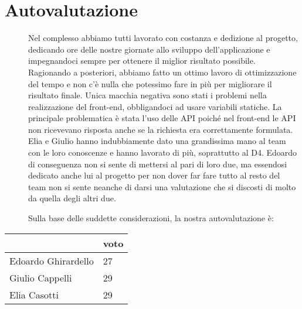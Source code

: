 \documentclass{article}
\begin{document}
\section{Autovalutazione}
\begin{description}
    \item[] Nel complesso abbiamo tutti lavorato con costanza e dedizione al progetto, dedicando ore delle nostre giornate allo sviluppo dell'applicazione e impegnandoci sempre per ottenere il miglior risultato possibile.
        Ragionando a posteriori, abbiamo fatto un ottimo lavoro di ottimizzazione del tempo e non c'è nulla che potessimo fare in più per migliorare il risultato finale.
        Unica macchia negativa sono stati i problemi nella realizzazione del front-end, obbligandoci ad usare variabili statiche.
        La principale problematica è stata l'uso delle API poiché nel front-end le API non ricevevano risposta anche se la richiesta era correttamente formulata.
        Elia e Giulio hanno indubbiamente dato una grandissima mano al team con le loro conoscenze e hanno lavorato di più, soprattutto al D4.
        Edoardo di conseguenza non si sente di mettersi al pari di loro due, ma essendosi dedicato anche lui al progetto per non dover far fare tutto al resto del team non si sente neanche di darsi una valutazione che si discosti di molto da quella degli altri due.
    \item[] Sulla base delle suddette considerazioni, la nostra autovalutazione è:
\end{description}
\begin{center}
    \begin{longtable}{|l|l|}
        \hline
                            & voto \\ \hline
        Edoardo Ghirardello & 27   \\ \hline
        Giulio Cappelli     & 29   \\ \hline
        Elia Casotti        & 29   \\ \hline
    \end{longtable}
\end{center}
\end{document}
